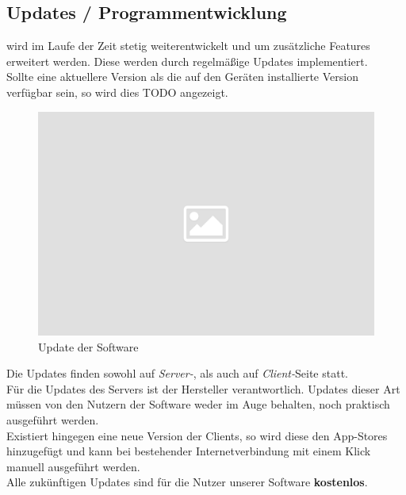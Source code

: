 \subsection{Updates / Programmentwicklung}

\noindent
\bb wird im Laufe der Zeit stetig weiterentwickelt und um zusätzliche Features
erweitert werden. Diese werden durch regelmäßige Updates implementiert.\\[.1cm]

\noindent
Sollte eine aktuellere Version als die auf den Geräten installierte Version verfügbar sein, so wird dies TODO angezeigt.\\[.1cm]

\noindent
\begin{figure}[ht]
	\centering
  \includegraphics[width=16cm]{pictures/placeholder.png}
	\caption{Update der Software}
	\label{pic/update}
\end{figure}


\noindent
Die Updates finden sowohl auf \textit{Server-}, als auch auf \textit{Client-}Seite
statt.\\[.1cm]
Für die Updates des Servers ist der Hersteller verantwortlich. Updates dieser Art
müssen von den Nutzern der Software weder im Auge behalten, noch praktisch ausgeführt werden.\\[.1cm]
Existiert hingegen eine neue Version der Clients, so wird diese den App-Stores hinzugefügt
und kann bei bestehender Internetverbindung mit einem Klick manuell ausgeführt werden.\\[.1cm]

\noindent
Alle zukünftigen Updates sind für die Nutzer unserer Software \textbf{kostenlos}.
